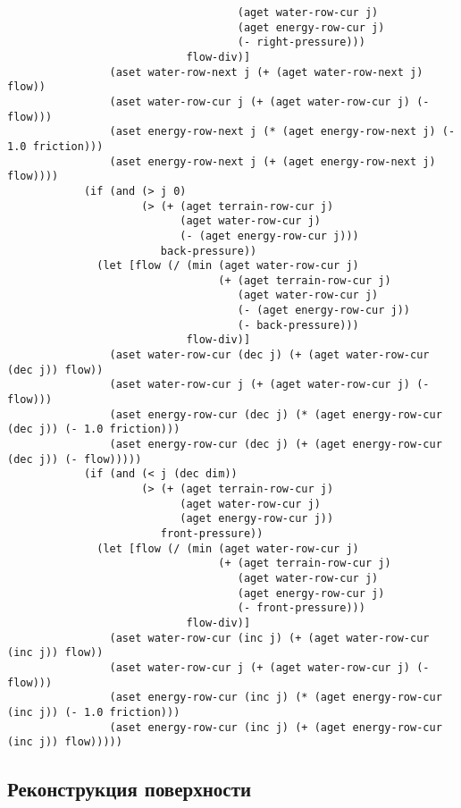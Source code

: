 \begin{lstlisting}
                                    (aget water-row-cur j)
                                    (aget energy-row-cur j)
                                    (- right-pressure)))
                            flow-div)]
                (aset water-row-next j (+ (aget water-row-next j) flow))
                (aset water-row-cur j (+ (aget water-row-cur j) (- flow)))
                (aset energy-row-next j (* (aget energy-row-next j) (- 1.0 friction)))
                (aset energy-row-next j (+ (aget energy-row-next j) flow))))
            (if (and (> j 0)
                     (> (+ (aget terrain-row-cur j)
                           (aget water-row-cur j)
                           (- (aget energy-row-cur j)))
                        back-pressure))
              (let [flow (/ (min (aget water-row-cur j)
                                 (+ (aget terrain-row-cur j)
                                    (aget water-row-cur j)
                                    (- (aget energy-row-cur j))
                                    (- back-pressure)))
                            flow-div)]
                (aset water-row-cur (dec j) (+ (aget water-row-cur (dec j)) flow))
                (aset water-row-cur j (+ (aget water-row-cur j) (- flow)))
                (aset energy-row-cur (dec j) (* (aget energy-row-cur (dec j)) (- 1.0 friction)))
                (aset energy-row-cur (dec j) (+ (aget energy-row-cur (dec j)) (- flow)))))
            (if (and (< j (dec dim))
                     (> (+ (aget terrain-row-cur j)
                           (aget water-row-cur j)
                           (aget energy-row-cur j))
                        front-pressure))
              (let [flow (/ (min (aget water-row-cur j)
                                 (+ (aget terrain-row-cur j)
                                    (aget water-row-cur j)
                                    (aget energy-row-cur j)
                                    (- front-pressure)))
                            flow-div)]
                (aset water-row-cur (inc j) (+ (aget water-row-cur (inc j)) flow))
                (aset water-row-cur j (+ (aget water-row-cur j) (- flow)))
                (aset energy-row-cur (inc j) (* (aget energy-row-cur (inc j)) (- 1.0 friction)))
                (aset energy-row-cur (inc j) (+ (aget energy-row-cur (inc j)) flow)))))
\end{lstlisting}


\subsection{Реконструкция поверхности}

